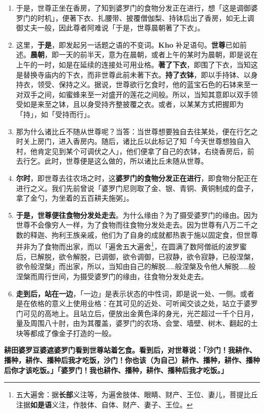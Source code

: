 \begin{enumerate}\item 于是，世尊正坐在香房，了知到婆罗门的食物分发正在进行，想「这是调御婆罗门的时机」，便著下衣、扎腰带、披覆僧伽梨、持钵后出了香房，如无上调御丈夫一般，因此尊者阿难说「于是，世尊晨朝著了下衣」。
\item 这里，\textbf{于是}，即发起另一话题之语的不变词。\textbf{Kho} 补足语句。\textbf{世尊}已如前述。\textbf{晨朝}，即一天的前半天，意为在晨朝，或者上午的某时为晨朝，即是说在上午的一时，如是在延续的连接处可用业格。\textbf{著了下衣}，即围了下衣，当知这是替换寺庙内的下衣，而非世尊此前未著下衣。\textbf{持了衣钵}，即以手持钵、以身持衣，领受、保持之义。据说，世尊欲行乞食时，他的蓝宝石色的石钵来至一对双手之间，如蜜蜂来至一对盛开的莲花之间般。所以，当知其意即以双手领受如是来至之钵，且以身受持齐整披覆之衣。或者，以某某方式把握即为「持」，如「受持而行」。
\item 那为什么诸比丘不随从世尊呢？当答：当世尊想要独自去往某处，便在行乞之时关上房门，进入香房内。随后，诸比丘以此标记了知「今天世尊想独自入村，他肯定见到某个可调伏之人」，他们便拿了自己的衣钵，右绕香房后，前去行乞。此时，世尊便是这么做的，所以诸比丘未随从世尊。
\item \textbf{尔时}，即世尊去往农场之时，这\textbf{婆罗门的食物分发正在进行}，即食物分配正在进行之义。我们先前曾说「婆罗门尼则取了金、银、青铜、黄铜制成的盘子，拿了金勺，为坐着的五百耕夫施粥」。
\item \textbf{于是，世尊便往食物分发处走去}。为什么缘由？为了摄受婆罗门的缘由。因为世尊不会像穷人一样，为了食物而往食物分发处走去。因为世尊有八万二千之数的释迦、拘利王族亲戚，他们为了自身的成就都热衷于施以固定食，但世尊并非为了食物而出家，而以「遍舍五大遍舍\footnote{五大遍舍：据\textbf{长部}义注等，为遍舍肢体、眼睛、财产、王位、妻儿，菩提比丘注据\textbf{如是语}义注，作肢体、自体、财产、妻子、王位。}，在圆满了数阿僧祇的波罗蜜后，已解脱，欲令解脱，已调御，欲令调御，已寂静，欲令寂静，已般涅槃，欲令般涅槃」而出家，所以，当知由自己的解脱……般涅槃及令他人解脱……般涅槃而周行世间，为摄受婆罗门的缘由，往食物分发处走去。
\item \textbf{走到后，站在一边}，「一边」是表示状态的中性词，即是说一处、一侧。或者是在依格的意义上使用业格：在其可见的近处、可听闻交谈之处，站立于婆罗门可见的高地上。且站立后，便放出金黄色泽的身光，光芒超过一千个日月，量及周围八十肘，由为其覆盖，婆罗门的农场、会堂、墙壁、树木、翻起的土块等都成了像金子打造的一般。\end{enumerate}

\textbf{耕田婆罗豆婆遮婆罗门看到世尊站着乞食。看到后，对世尊说：「沙门！我耕作、播种，耕作、播种后我才吃饭，沙门！你也该（为自己）耕作、播种，耕作、播种后你才该吃饭。」「婆罗门！我也耕作、播种，耕作、播种后我才吃饭。」}


